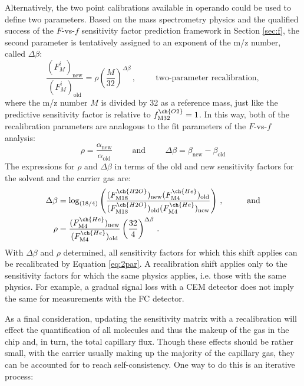 \documentclass{article}
\begin{document}
Alternatively, the two point calibrations available in operando could be used to define two parameters. Based on the mass spectrometry physics and the qualified success of the $F$-vs-$f$ sensitivity factor prediction framework in Section \ref{sec:f}, the second parameter is tentatively assigned to an exponent of the m/z number, called $\Delta \beta$:
\begin{equation}
\frac{(F_M^i)_\text{new}}{(F_M^i)_\text{old}} = \rho \left(\frac{M}{32}\right)^{\Delta \beta} \,, \hspace{1cm} \text{two-parameter recalibration}, \label{eq:2par}
\end{equation}
where the m/z number $M$ is divided by 32 as a reference mass, just like the predictive sensitivity factor is relative to $f^{\ch{O2}}_\text{M32}=1$. In this way, both of the recalibration parameters are analogous to the fit parameters of the $F$-vs-$f$ analysis:
\begin{equation}
\rho = \frac{\alpha_\text{new}}{\alpha_\text{old}}\hspace{1cm}\text{and}\hspace{1cm}\Delta \beta = \beta_\text{new} - \beta_\text{old}
\end{equation}
The expressions for $\rho$ and $\Delta \beta$ in terms of the old and new sensitivity factors for the solvent and the carrier gas are:
\begin{align}
\Delta \beta &= \log_{(18/4)}\left(
	\frac {(F^{\ch{H2O}}_\text{M18})_\text{new}(F^{\ch{He}}_\text{M4})_\text{old}} {(F^{\ch{H2O}}_\text{M18})_\text{old}(F^{\ch{He}}_\text{M4})_\text{new}}  
\right) \,,\hspace{1cm} \text{and} \label{eq:db} \\
\rho &= \frac{(F^{\ch{He}}_\text{M4})_\text{new}}{(F^{\ch{He}}_\text{M4})_\text{old}} \left(\frac{32}{4}\right)^{\Delta \beta}\,. \label{eq:rho}
\end{align}
With $\Delta \beta$ and $\rho$ determined, all sensitivity factors for which this shift applies can be recalibrated by Equation \ref{eq:2par}. A recalibration shift applies only to the sensitivity factors for which the same physics applies, i.e. those with the same physics. For example, a gradual signal loss with a CEM detector does not imply the same for measurements with the FC detector.

As a final consideration, updating the sensitivity matrix with a recalibration will effect the quantification of all molecules and thus the makeup of the gas in the chip and, in turn, the total capillary flux. Though these effects should be rather small, with the carrier usually making up the majority of the capillary gas, they can be accounted for to reach self-consistency. One way to do this is an iterative process:
\end{document}
